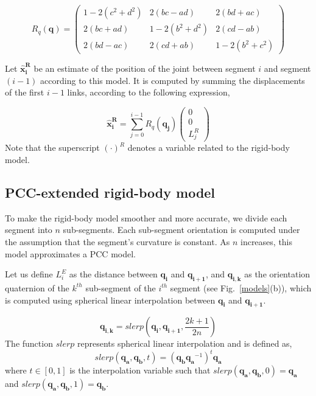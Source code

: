 \begin{equation}
    R_q(\mathbf{q}) = \begin{pmatrix} 1 - 2(c^2+d^2) & 2(b c-a d) & 2(b d + a c) \\ 
    2(b c + a d) & 1 - 2(b^2 + d^2) & 2(c d - a b) \\
    2(b d - a c) & 2(c d + a b) & 1 - 2(b^2 + c^2) \end{pmatrix}
\end{equation}

Let $\mathbf{\hat{x}^{R}_i}$ be an estimate of the position of the joint between segment $i$ and segment $(i-1)$ according to this model.
It is computed by summing the displacements of the first $i-1$ links, according to the following expression,


\begin{equation}
    \mathbf{\hat{x}^{R}_i} =  \sum_{j=0}^{i-1} R_q(\mathbf{q_j}) \begin{pmatrix} 0 \\0 \\ L^R_j \end{pmatrix}
       \label{formula_rigid_body_model_2}
\end{equation}
Note that the superscript $(\cdot)^R$ denotes a variable related to the rigid-body model.

\subsection{PCC-extended rigid-body model} \label{pseudo-PCC rigid body model}

To make the rigid-body model smoother and more accurate, we divide each segment into $n$ sub-segments.
Each sub-segment orientation is computed under the assumption that the segment's curvature is constant.
As $n$ increases, this model approximates a PCC model.

Let us define $L^E_i$ as the distance between $\mathbf{q_i}$ and $\mathbf{q_{i+1}}$,
%
and $\mathbf{q_{i,k}}$ as the orientation quaternion of the $k^{th}$ sub-segment of the $i^{th}$ segment (see Fig.~\ref{models}(b)), which is computed using spherical linear interpolation between $\mathbf{q_i}$ and $\mathbf{q_{i+1}}$.

\begin{equation}
    \mathbf{q_{i,k}}=slerp\left(\mathbf{q_i},\mathbf{q_{i+1}},\frac{2k+1}{2n}\right)
\end{equation}
The function $slerp$ represents spherical linear interpolation \cite{fast_slerp} and is defined as,
\begin{equation}
slerp(\mathbf{q_a},\mathbf{q_b},t) = (\mathbf{q_b} \mathbf{q_a}^{-1})^t \mathbf{q_a}
\end{equation}
where $t \in [0,1]$ is the interpolation variable such that $slerp(\mathbf{q_a},\mathbf{q_b},0) = \mathbf{q_a}$ and $slerp(\mathbf{q_a},\mathbf{q_b},1) = \mathbf{q_b}$. \\

